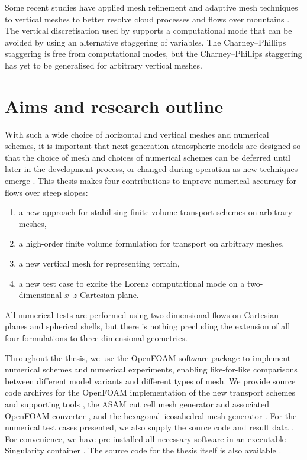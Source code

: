 Some recent studies have applied mesh refinement and adaptive mesh techniques to vertical meshes to better resolve cloud processes \citep{mueller2013} and flows over mountains \citep{yamazaki-satomura2012}.  
The vertical discretisation used by \citet{yamazaki-satomura2012} supports a computational mode \citep{thuburn-woolings2005} that can be avoided by using an alternative staggering of variables.
The Charney--Phillips staggering is free from computational modes, but the Charney--Phillips staggering has yet to be generalised for arbitrary vertical meshes.

\section{Aims and research outline}

With such a wide choice of horizontal and vertical meshes and numerical schemes, it is important that next-generation atmospheric models are designed so that the choice of mesh and choices of numerical schemes can be deferred until later in the development process, or changed during operation as new techniques emerge \citep{ford2013, theurich2016}.
This thesis makes four contributions to improve numerical accuracy for flows over steep slopes:
\begin{enumerate}
\item a new approach for stabilising finite volume transport schemes on arbitrary meshes,
\item a high-order finite volume formulation for transport on arbitrary meshes,
\item a new vertical mesh for representing terrain,
\item a new test case to excite the Lorenz computational mode on a two-dimensional $x$--$z$ Cartesian plane.
\end{enumerate}
All numerical tests are performed using two-dimensional flows on Cartesian planes and spherical shells, but there is nothing precluding the extension of all four formulations to three-dimensional geometries.

Throughout the thesis, we use the OpenFOAM software package  to implement numerical schemes and numerical experiments, enabling like-for-like comparisons between different model variants and different types of mesh.
We provide source code archives for the OpenFOAM implementation of the new transport schemes \citep{atmosfoam,highOrderFit} and supporting tools \citep{atmosfoam-tools,ninjaopenfoam}, the ASAM cut cell mesh generator \citep{asam_grid} and associated OpenFOAM converter \citep{gmv2openfoam}, and the hexagonal–icosahedral mesh generator \citep{geodesic-mesh}.
For the numerical test cases presented, we also supply the source code \citep{atmostests} and result data \citep{atmostests-results}.
For convenience, we have pre-installed all necessary software in an executable Singularity container \citep{atmostests-singularity}.
The source code for the thesis itself is also available \citep{thesis}.

